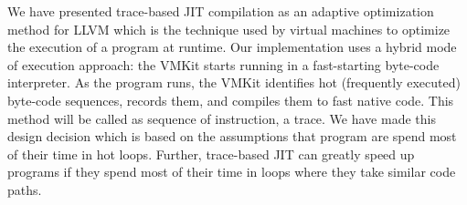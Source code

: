 
\label{sec:tolerance} 	
We have presented trace-based JIT compilation as an adaptive optimization method for LLVM which is the technique used by virtual machines to optimize the execution of a program at runtime. Our implementation uses a hybrid mode of execution approach: the VMKit starts running in a fast-starting byte-code interpreter. As the program runs, the VMKit identifies hot (frequently executed) byte-code sequences, records them, and compiles them to fast native code. This method will be called as sequence of instruction, a trace. We have made this design decision which is based on the assumptions that program are spend most of their time in hot loops. Further, trace-based JIT can greatly speed up programs if they spend most of their time in loops where they take similar code paths.